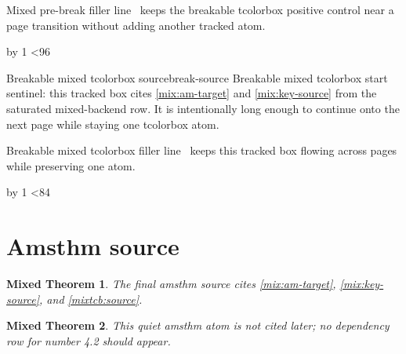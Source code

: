 \documentclass{article}
\newtheorem{mixthm}{Mixed Theorem}[section]
\begin{document}
\newcount\codeptcbgraypreline
{}
\loop
  Mixed pre-break filler line \the\codeptcbgraypreline\ keeps the breakable tcolorbox positive control near a page transition without adding another tracked atom.\par
  \advance\codeptcbgraypreline by 1
\ifnum\codeptcbgraypreline<96
\repeat

\begin{mixtcb}[breakable,colback=green!5,colframe=green!60!black]{Breakable mixed tcolorbox source}{break-source}
Breakable mixed tcolorbox start sentinel: this tracked box cites \autoref{mix:am-target} and \cref{mix:key-source} from the saturated mixed-backend row.
It is intentionally long enough to continue onto the next page while staying one tcolorbox atom.

\newcount\codeptcbgrayline
{}
\loop
  Breakable mixed tcolorbox filler line \the\codeptcbgrayline\ keeps this tracked box flowing across pages while preserving one atom.\par
  \advance\codeptcbgrayline by 1
\ifnum\codeptcbgrayline<84
\repeat
\end{mixtcb}

\section{Amsthm source}
\label{sec:mixed-am-source}

\begin{mixthm}\label{mix:am-source}
The final amsthm source cites \autoref{mix:am-target}, \cref{mix:key-source}, and \cref{mixtcb:source}.
\end{mixthm}

\begin{mixthm}\label{mix:quiet}
This quiet amsthm atom is not cited later; no dependency row for number 4.2 should appear.
\end{mixthm}

\END
\end{document}
